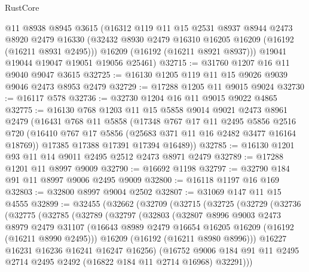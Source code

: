 \begin{lexlean}{RustCore}
\begin{coremodule}
      @11
      @8938
      @8945
      @3615
      (@16312
        @119
        @11
        @15
        @2531
        @8937
        @8944
        @2473
        @8920
        @2479
        @16330
        (@32432 @8930 @2479 @16310 @16205 @16209 (@16192 (@16211 @8931 @2495)))
        @16209
        (@16192 (@16211 @8921 @8937)))
      @19041
      @19044
      @19047
      @19051
      @19056
      @25461)
@32715 := @31760 @1207 @16 @11 @9040 @9047 @3615
@32725 := @16130 @1205 @119 @11 @15 @9026 @9039 @9046 @2473 @8953 @2479
@32729 := @17288 @1205 @11 @9015 @9024
@32730 := @16117 @578
@32736 := @32730 @1204 @16 @11 @9015 @9022 @4865
@32775 := @16130
    @768
    @1203
    @11
    @15
    @5858
    @9014
    @9021
    @2473
    @8961
    @2479
    (@16431
      @768
      @11
      @5858
      (@17348
        @767
        @17
        @11
        @2495
        @5856
        @2516
        @720
        (@16410 @767 @17 @5856 (@25683 @371 @11 @16 @2482 @3477 @16164 @18769))
        @17385
        @17388
        @17391
        @17394
        @16489))
@32785 := @16130 @1201 @93 @11 @14 @9011 @2495 @2512 @2473 @8971 @2479
@32789 := @17288 @1201 @11 @8997 @9009
@32790 := @16692 @1198
@32797 := @32790 @184 @91 @11 @8997 @9006 @2495 @9009
@32800 := @16118 @1197 @16 @169
@32803 := @32800 @8997 @9004 @2502
@32807 := @31069 @147 @11 @15 @4555
@32899 := @32455
    (@32662
      (@32709
        (@32715
          (@32725
            (@32729
              (@32736
                (@32775
                  (@32785
                    (@32789
                      (@32797
                        (@32803
                          (@32807
                            @8996
                            @9003
                            @2473
                            @8979
                            @2479
                            @31107
                            (@16643 @8989 @2479 @16654 @16205 @16209 (@16192 (@16211 @8990 @2495)))
                            @16209
                            (@16192 (@16211 @8980 @8996)))
                          @16227
                          @16231
                          @16236
                          @16241
                          @16247
                          @16256)
                        (@16752
                          @9006
                          @184
                          @91
                          @11
                          @2495
                          @2714
                          @2495
                          @2492
                          (@16822 @184 @11 @2714 @16968)
                          @32291)))

\end{coremodule}
\end{lexlean}
